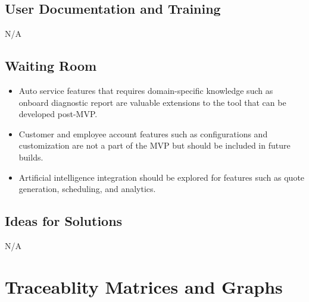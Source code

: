 \documentclass[12pt]{article}
\begin{document}
\subsection{User Documentation and Training}
N/A
\subsection{Waiting Room}
\begin{itemize}
    \item Auto service features that requires domain-specific knowledge such as 
    onboard diagnostic report are valuable extensions to the tool that can be 
    developed post-MVP.
    \item Customer and employee account features such as configurations and 
    customization are not a part of the MVP but should be included in future 
    builds.
    \item Artificial intelligence integration should be explored for features 
    such as quote generation, scheduling, and analytics.
\end{itemize}
\subsection{Ideas for Solutions}
N/A

\newpage
\section{Traceablity Matrices and Graphs}
\end{document}
